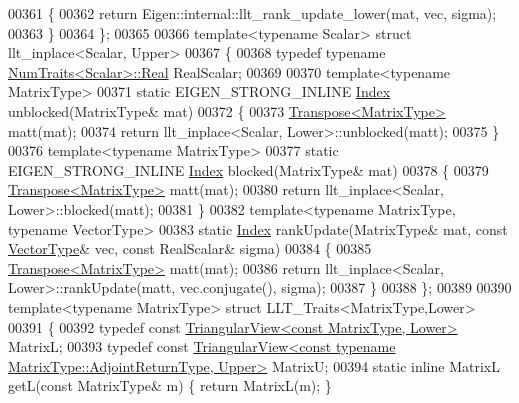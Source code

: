 \begin{DoxyCode}
00361   \{
00362     \textcolor{keywordflow}{return} Eigen::internal::llt\_rank\_update\_lower(mat, vec, sigma);
00363   \}
00364 \};
00365 
00366 \textcolor{keyword}{template}<\textcolor{keyword}{typename} Scalar> \textcolor{keyword}{struct }llt\_inplace<Scalar, Upper>
00367 \{
00368   \textcolor{keyword}{typedef} \textcolor{keyword}{typename} \hyperlink{group___core___module_struct_eigen_1_1_num_traits}{NumTraits<Scalar>::Real} RealScalar;
00369 
00370   \textcolor{keyword}{template}<\textcolor{keyword}{typename} MatrixType>
00371   \textcolor{keyword}{static} EIGEN\_STRONG\_INLINE \hyperlink{group___cholesky___module_ac7a64274814fa76e8b1e9e945546037f}{Index} unblocked(MatrixType& mat)
00372   \{
00373     \hyperlink{group___core___module_class_eigen_1_1_transpose}{Transpose<MatrixType>} matt(mat);
00374     \textcolor{keywordflow}{return} llt\_inplace<Scalar, Lower>::unblocked(matt);
00375   \}
00376   \textcolor{keyword}{template}<\textcolor{keyword}{typename} MatrixType>
00377   \textcolor{keyword}{static} EIGEN\_STRONG\_INLINE \hyperlink{group___cholesky___module_ac7a64274814fa76e8b1e9e945546037f}{Index} blocked(MatrixType& mat)
00378   \{
00379     \hyperlink{group___core___module_class_eigen_1_1_transpose}{Transpose<MatrixType>} matt(mat);
00380     \textcolor{keywordflow}{return} llt\_inplace<Scalar, Lower>::blocked(matt);
00381   \}
00382   \textcolor{keyword}{template}<\textcolor{keyword}{typename} MatrixType, \textcolor{keyword}{typename} VectorType>
00383   \textcolor{keyword}{static} \hyperlink{group___cholesky___module_ac7a64274814fa76e8b1e9e945546037f}{Index} rankUpdate(MatrixType& mat, \textcolor{keyword}{const} \hyperlink{struct_vector_type}{VectorType}& vec, \textcolor{keyword}{const} RealScalar& sigma)
00384   \{
00385     \hyperlink{group___core___module_class_eigen_1_1_transpose}{Transpose<MatrixType>} matt(mat);
00386     \textcolor{keywordflow}{return} llt\_inplace<Scalar, Lower>::rankUpdate(matt, vec.conjugate(), sigma);
00387   \}
00388 \};
00389 
00390 \textcolor{keyword}{template}<\textcolor{keyword}{typename} MatrixType> \textcolor{keyword}{struct }LLT\_Traits<MatrixType,Lower>
00391 \{
00392   \textcolor{keyword}{typedef} \textcolor{keyword}{const} \hyperlink{group___core___module_class_eigen_1_1_triangular_view}{TriangularView<const MatrixType, Lower>} MatrixL;
00393   \textcolor{keyword}{typedef} \textcolor{keyword}{const} 
      \hyperlink{group___core___module_class_eigen_1_1_triangular_view}{TriangularView<const typename MatrixType::AdjointReturnType, Upper>}
       MatrixU;
00394   \textcolor{keyword}{static} \textcolor{keyword}{inline} MatrixL getL(\textcolor{keyword}{const} MatrixType& m) \{ \textcolor{keywordflow}{return} MatrixL(m); \}

\end{DoxyCode}
